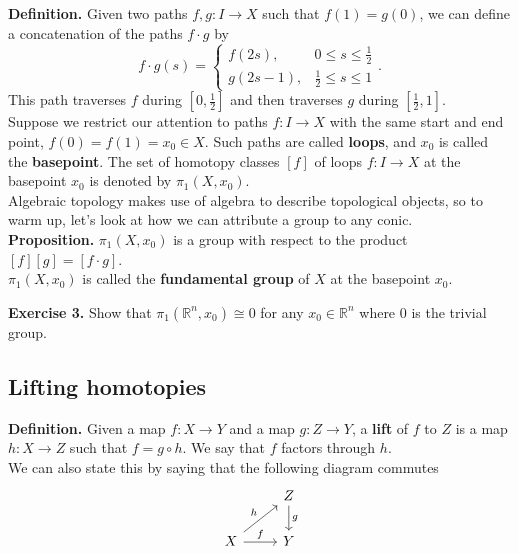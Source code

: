 \documentclass[a4paper]{article}
\theoremstyle{plain}%
\theoremstyle{definition}
\theoremstyle{remark}
\begin{document}
\textbf{Definition.} Given two paths $f,g  \colon I \to X$ such that
$f(1) = g(0)$, we can define a concatenation of the paths
$f \cdot g$ by
\[
f \cdot  g (s) = \begin{cases}
    f(2s), & 0 \le s \le \frac{1}{2}\\
    g(2s-1), & \frac{1}{2} \le s \le 1
\end{cases}.
\] 
This path traverses $f$ during $\left[ 0,\frac{1}{2} \right] $ and then
traverses $g$ during $\left[ \frac{1}{2},1 \right]$.\\
\linebreak
Suppose we restrict our attention to paths
$f  \colon I \to X$ with the same start and end point, $f(0) = f(1) = x_0 \in
X$. Such paths are called \textbf{loops}, and $x_0$ is called the
\textbf{basepoint}. The set of homotopy classes $\left[ f \right] $ of loops
$f  \colon I \to X$ at the basepoint $x_0$ is denoted by
$\pi_1 (X,x_0)$.\\
\linebreak
Algebraic topology makes use of algebra to describe topological objects, so to
warm up, let's look at how we can attribute a group to any conic.\\
\linebreak
\textbf{Proposition.} $\pi_1(X,x_0)$ is a group with respect to the product
$\left[ f \right] \left[ g \right] =
\left[ f \cdot g \right] $.\\
$\pi_1 (X,x_0)$ is called the \textbf{fundamental group} of $X$ at the
basepoint
$x_0$.\\
\linebreak


\textbf{Exercise 3.} Show that $\pi_1 (\mathbb{R}^{n},x_0) \cong 0$ for any
$x_0 \in \mathbb{R}^{n}$ where $0$ is the trivial group.




\subsection*{Lifting homotopies}
\textbf{Definition.}
    Given a map $f  \colon X \to Y$ and a map $g  \colon Z \to Y$, a 
    \textbf{lift} of $f$ to $Z$ is a map
    $h  \colon X \to Z$ such that $f = g \circ h$. We say that
    $f$ factors through $h$.\\
    We can also state this by saying that the following diagram commutes
    \begin{equation*}
    \begin{tikzcd}
        & Z \ar[d, "g"]\\
        X \ar[ru, "h"] \ar[r, "f"] & Y
    \end{tikzcd}
    \end{equation*}
    
\end{document}
